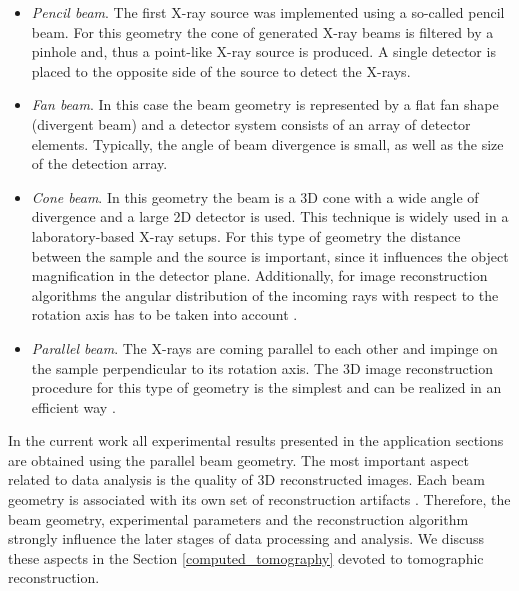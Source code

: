 \begin{itemize}
\item \textit{Pencil beam}. The first X-ray source was implemented using a so-called pencil beam. For this geometry the cone of generated X-ray beams is filtered by a pinhole and, thus a point-like X-ray source is produced. A single detector is placed to the opposite side of the source to detect the X-rays.

\item \textit{Fan beam}. In this case the beam geometry is represented by a flat fan shape (divergent beam) and a detector system consists of an array of detector elements. Typically, the angle of beam divergence is small, as well as the size of the detection array.

\item \textit{Cone beam}. In this geometry the beam is a 3D cone with a wide angle of divergence and a large 2D detector is used. This technique is widely used in a laboratory-based X-ray setups. For this type of geometry the distance between the sample and the source is important, since it influences the object magnification in the detector plane.
Additionally, for image reconstruction algorithms the angular distribution of the incoming rays with respect to the rotation axis has to be taken into account \cite{Kak01}.

\item \textit{Parallel beam}.  The X-rays are coming parallel to each other and impinge on the sample perpendicular to its rotation axis. The 3D image reconstruction procedure for this type of geometry is the simplest and can be realized in an efficient way \cite{Kak01}.
\end{itemize}


 
 In the current work all experimental results presented in the application sections are obtained using the parallel beam geometry. The most important aspect related to data analysis is the quality of 3D reconstructed images. Each beam geometry is associated with its own set of reconstruction artifacts \cite{Buzug08}. Therefore, the beam geometry, experimental parameters and the reconstruction algorithm strongly influence the later stages of data processing and analysis. We discuss these aspects in the Section \ref{computed_tomography} devoted to tomographic reconstruction.    




